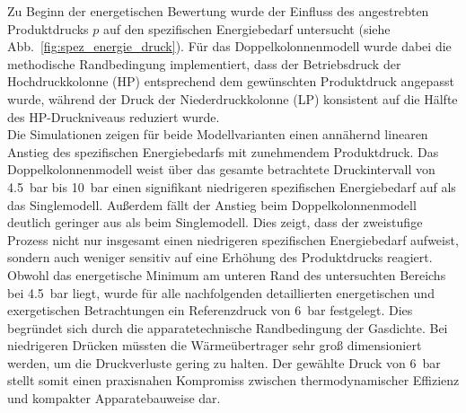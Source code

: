 \noindent
Zu Beginn der energetischen Bewertung wurde der Einfluss des angestrebten Produktdrucks $p$ auf den spezifischen Energiebedarf untersucht (siehe Abb.~\ref{fig:spez_energie_druck}).
Für das Doppelkolonnenmodell wurde dabei die methodische Randbedingung implementiert, dass der Betriebsdruck der Hochdruckkolonne (HP) entsprechend dem gewünschten Produktdruck angepasst wurde, während der Druck der Niederdruckkolonne (LP) konsistent auf die Hälfte des HP-Druckniveaus reduziert wurde.\\
Die Simulationen zeigen für beide Modellvarianten einen annähernd linearen Anstieg des spezifischen Energiebedarfs mit zunehmendem Produktdruck. Das Doppelkolonnenmodell weist über das gesamte betrachtete Druckintervall von \SI{4,5}{bar} bis \SI{10}{bar} einen signifikant niedrigeren spezifischen Energiebedarf auf als das Singlemodell. Außerdem fällt der Anstieg beim Doppelkolonnenmodell deutlich geringer aus als beim Singlemodell. Dies zeigt, dass der zweistufige Prozess nicht nur insgesamt einen niedrigeren spezifischen Energiebedarf aufweist, sondern auch weniger sensitiv auf eine Erhöhung des Produktdrucks reagiert.\\
Obwohl das energetische Minimum am unteren Rand des untersuchten Bereichs bei \SI{4,5}{bar} liegt, wurde für alle nachfolgenden detaillierten energetischen und exergetischen Betrachtungen ein Referenzdruck von \SI{6}{bar} festgelegt. Dies begründet sich durch die apparatetechnische Randbedingung der Gasdichte. Bei niedrigeren Drücken müssten die Wärmeübertrager sehr groß dimensioniert werden, um die Druckverluste gering zu halten. Der gewählte Druck von \SI{6}{bar} stellt somit einen praxisnahen Kompromiss zwischen thermodynamischer Effizienz und kompakter Apparatebauweise dar.

